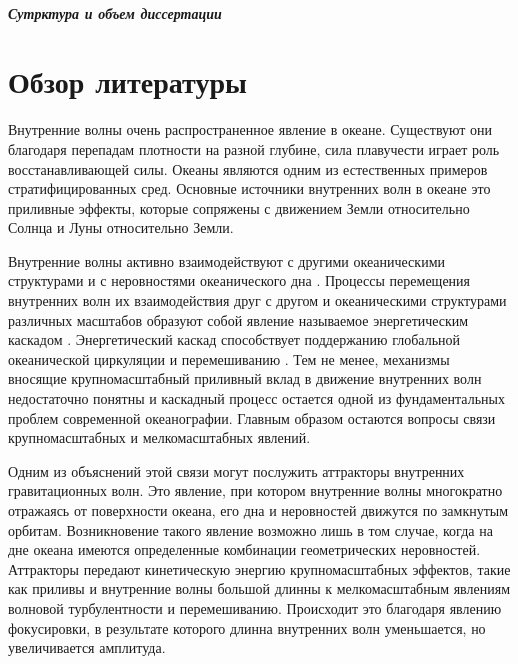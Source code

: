 \paragraph{Сутрктура и объем диссертации}

\mainmatter

\chapter{Обзор литературы}

Внутренние волны очень распространенное явление в океане. Существуют они благодаря перепадам плотности на разной глубине, сила плавучести играет роль восстанавливающей силы. Океаны являются одним из естественных примеров стратифицированных сред. Основные источники внутренних волн в океане это приливные эффекты, которые сопряжены с движением Земли относительно Солнца и Луны относительно Земли.

Внутренние волны активно взаимодействуют с другими океаническими структурами \cite{Rainville2006} и с неровностями океанического дна \cite{DAUXOIS1999}. Процессы перемещения внутренних волн их взаимодействия друг с другом и океаническими структурами различных масштабов образуют собой явление называемое энергетическим каскадом \cite{Garrett1972}. Энергетический каскад способствует поддержанию глобальной океанической циркуляции и перемешиванию \cite{Nikurashin2012,Munk1998}. Тем не менее, механизмы вносящие крупномасштабный приливный вклад в движение внутренних волн недостаточно понятны \cite{Ivey2008,Polzin1997} и каскадный процесс остается одной из фундаментальных проблем современной океанографии. Главным образом остаются вопросы связи крупномасштабных и мелкомасштабных явлений.

Одним из объяснений этой связи могут послужить аттракторы внутренних гравитационных волн. Это явление, при котором внутренние волны многократно отражаясь от поверхности океана, его дна и неровностей движутся по замкнутым орбитам. Возникновение такого явление возможно лишь в том случае, когда на дне океана имеются определенные комбинации геометрических неровностей. Аттракторы передают кинетическую энергию крупномасштабных эффектов, такие как приливы и внутренние волны большой длинны к мелкомасштабным явлениям волновой турбулентности и перемешиванию. Происходит это благодаря явлению фокусировки, в результате которого длинна внутренних волн уменьшается, но увеличивается амплитуда.

